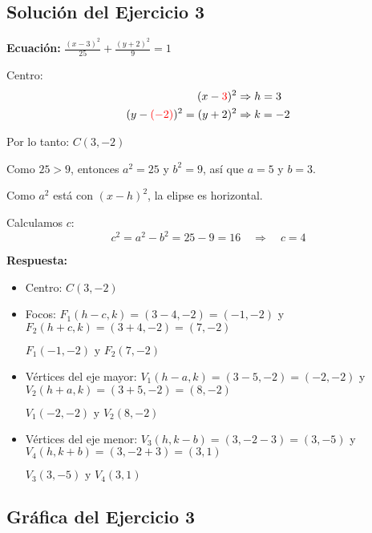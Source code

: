 \documentclass[12pt,a4paper]{article}
\begin{document}
	\subsection*{Solución del Ejercicio 3}

	\textbf{Ecuación:} $\displaystyle\frac{(x-3)^2}{25}+\frac{(y+2)^2}{9}=1$

	\bigskip

	Centro:
	\[
	\begin{aligned}
		(x-{\color{red}{3}})^2&\Rightarrow h=3\\
		(y-{\color{red}{(-2)}})^2=(y+2)^2&\Rightarrow k=-2
	\end{aligned}
	\]

	Por lo tanto: $\boxed{C(3,-2)}$

	\bigskip

	Como $25>9$, entonces $a^2=25$ y $b^2=9$, así que $a=5$ y $b=3$.

	\bigskip

	Como $a^2$ está con $(x-h)^2$, la elipse es horizontal.

	\bigskip

	Calculamos $c$:
	\[
	c^2=a^2-b^2=25-9=16 \quad\Rightarrow\quad c=4
	\]

	\textbf{Respuesta:}
	\begin{itemize}
		\item Centro: $\boxed{C(3,-2)}$
		\item Focos: $F_1(h-c,k)=(3-4,-2)=(-1,-2)$ y $F_2(h+c,k)=(3+4,-2)=(7,-2)$

		$\boxed{F_1(-1,-2)\text{ y }F_2(7,-2)}$

		\item Vértices del eje mayor: $V_1(h-a,k)=(3-5,-2)=(-2,-2)$ y $V_2(h+a,k)=(3+5,-2)=(8,-2)$

		$\boxed{V_1(-2,-2)\text{ y }V_2(8,-2)}$

		\item Vértices del eje menor: $V_3(h,k-b)=(3,-2-3)=(3,-5)$ y $V_4(h,k+b)=(3,-2+3)=(3,1)$

		$\boxed{V_3(3,-5)\text{ y }V_4(3,1)}$
	\end{itemize}

	\subsection*{Gráfica del Ejercicio 3}
\end{document}
